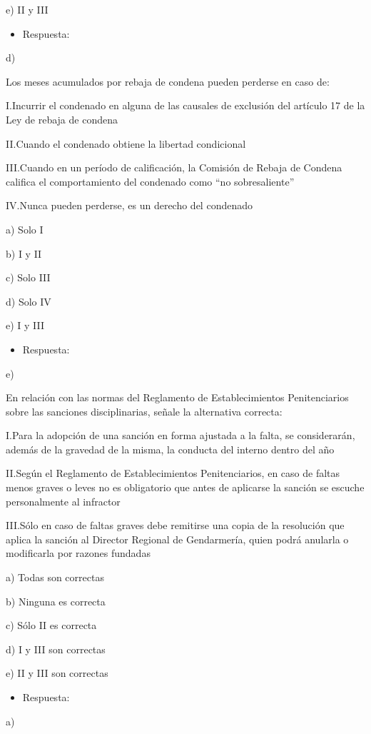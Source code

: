 \documentclass[letterpaper, 11pt]{article}
\begin{document}
e) II y III

\begin{itemize}
\item Respuesta:
\end{itemize}
d)



Los meses acumulados por rebaja de condena pueden perderse en caso de:

I.Incurrir el condenado en alguna de las causales de exclusión del artículo 17 de la
Ley de rebaja de condena

II.Cuando el condenado obtiene la libertad condicional

III.Cuando en un período de calificación, la Comisión de Rebaja de Condena califica el
comportamiento del condenado como “no sobresaliente”

IV.Nunca pueden perderse, es un derecho del condenado

a) Solo I

b) I y II

c) Solo III

d) Solo IV

e) I y III

\begin{itemize}
\item Respuesta:
\end{itemize}
e)


En relación con las normas del Reglamento de Establecimientos Penitenciarios
sobre las sanciones disciplinarias, señale la alternativa correcta:

I.Para la adopción de una sanción en forma ajustada a la falta, se considerarán,
además de la gravedad de la misma, la conducta del interno dentro del año

II.Según el Reglamento de Establecimientos Penitenciarios, en caso de faltas menos
graves o leves no es obligatorio que antes de aplicarse la sanción se escuche
personalmente al infractor

III.Sólo en caso de faltas graves debe remitirse una copia de la resolución que aplica
la sanción al Director Regional de Gendarmería, quien podrá anularla o modificarla
por razones fundadas

a) Todas son correctas

b) Ninguna es correcta

c) Sólo II es correcta

d) I y III son correctas

e) II y III son correctas

\begin{itemize}
\item Respuesta:
\end{itemize}
a)
\end{document}
